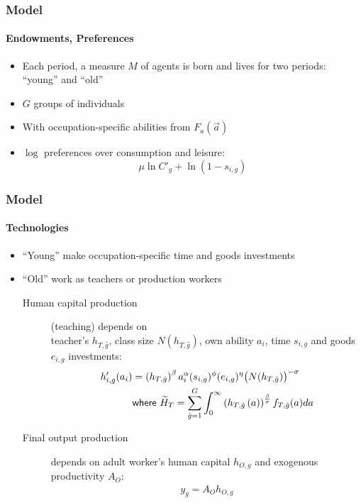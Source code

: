 \documentclass[11pt]{beamer}
\begin{document}
	\begin{frame}
		\frametitle{Model}
		\framesubtitle{Endowments, Preferences}
		\begin{itemize}
			\item Each period, a measure $M$ of agents is born and lives for two periods: ``young'' and ``old''
			\item $G$ groups of individuals
			\item With occupation-specific abilities from $F_a(\vec{a})$
			\item $\log$ preferences over consumption and leisure:
			\begin{displaymath}
				\mu \ln C'_{g} + \ln\left(1-s_{i,g} \right)
			\end{displaymath}
		\end{itemize}
	\end{frame}
	
	\begin{frame}
		\frametitle{Model}
		\framesubtitle{Technologies}
		\begin{itemize}
			\item ``Young'' make occupation-specific time and goods investments
			\item ``Old'' work as \alert{teachers} or \alert{production workers}
			\begin{description}
				\item[Human capital production] (teaching) depends on\\
				teacher's $h_{T,\hat{g}}$, class size $N(h_{T,\hat{g}})$,  own ability $a_i$, time $s_{i,g}$ and goods $e_{i,g}$ investments:
				\begin{align*}
					\label{}
					h'_{i,g}(a_i) & =\left( h_{T,\hat{g}}\right)^\beta a_i^\alpha(s_{i,g})^{\phi} (e_{i,g})^{\eta}\big(N(h_{T,\hat{g}})\big)^{-\sigma}\\
					& \textrm{{\sf where }} \widetilde{H}_T =\sum_{\hat{g}=1}^G \int_0^\infty \left( h_{T,\hat{g}}\left( a \right) \right)^{\frac{\beta}{\sigma}} f_{T,\hat{g}}(a) da
				\end{align*}
				\item[Final output production] depends on adult worker's human capital $h_{O,g}$ and exogenous productivity $A_O$:
				\begin{align*}
					\label{}
					y_g = A_O h_{O,g}
				\end{align*}
			\end{description}
		\end{itemize}
	\end{frame}
	
\end{document}
